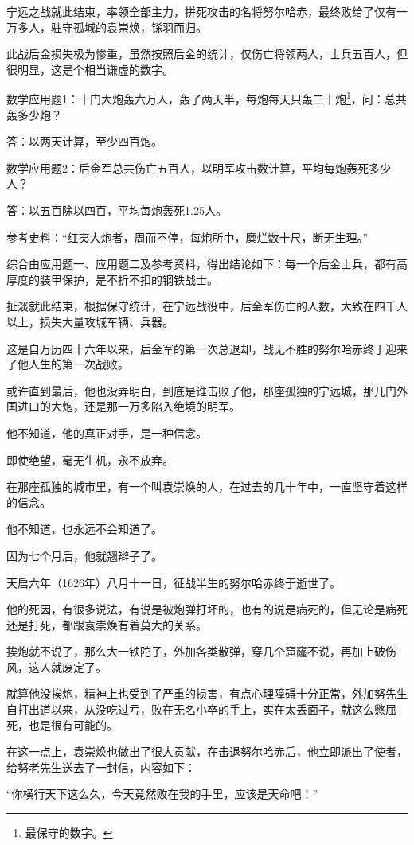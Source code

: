 \begin{multicols}{\theparacolNo}
宁远之战就此结束，率领全部主力，拼死攻击的名将努尔哈赤，最终败给了仅有一万多人，驻守孤城的袁崇焕，铩羽而归。

此战后金损失极为惨重，虽然按照后金的统计，仅伤亡将领两人，士兵五百人，但很明显，这是个相当谦虚的数字。

数学应用题1：十门大炮轰六万人，轰了两天半，每炮每天只轰二十炮\footnote{最保守的数字。}，问：总共轰多少炮？

答：以两天计算，至少四百炮。

数学应用题2：后金军总共伤亡五百人，以明军攻击数计算，平均每炮轰死多少人？

答：以五百除以四百，平均每炮轰死1.25人。

参考史料：“红夷大炮者，周而不停，每炮所中，糜烂数十尺，断无生理。”

综合由应用题一、应用题二及参考资料，得出结论如下：每一个后金士兵，都有高厚度的装甲保护，是不折不扣的钢铁战士。

扯淡就此结束，根据保守统计，在宁远战役中，后金军伤亡的人数，大致在四千人以上，损失大量攻城车辆、兵器。

这是自万历四十六年以来，后金军的第一次总退却，战无不胜的努尔哈赤终于迎来了他人生的第一次战败。

或许直到最后，他也没弄明白，到底是谁击败了他，那座孤独的宁远城，那几门外国进口的大炮，还是那一万多陷入绝境的明军。

他不知道，他的真正对手，是一种信念。

即使绝望，毫无生机，永不放弃。

在那座孤独的城市里，有一个叫袁崇焕的人，在过去的几十年中，一直坚守着这样的信念。

他不知道，也永远不会知道了。

因为七个月后，他就翘辫子了。

天启六年（1626年）八月十一日，征战半生的努尔哈赤终于逝世了。

他的死因，有很多说法，有说是被炮弹打坏的，也有的说是病死的，但无论是病死还是打死，都跟袁崇焕有着莫大的关系。

挨炮就不说了，那么大一铁陀子，外加各类散弹，穿几个窟窿不说，再加上破伤风，这人就废定了。

就算他没挨炮，精神上也受到了严重的损害，有点心理障碍十分正常，外加努先生自打出道以来，从没吃过亏，败在无名小卒的手上，实在太丢面子，就这么憋屈死，也是很有可能的。

在这一点上，袁崇焕也做出了很大贡献，在击退努尔哈赤后，他立即派出了使者，给努老先生送去了一封信，内容如下：

“你横行天下这么久，今天竟然败在我的手里，应该是天命吧！”


\end{multicols}
